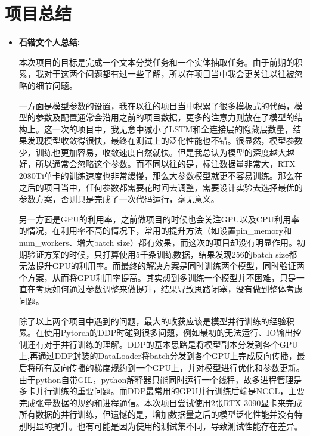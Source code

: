 \documentclass[letterpaper]{article}
\begin{document}
\section{项目总结}
\begin{itemize}
  \item \textbf{石锴文个人总结:} 
  
  本次项目的目标是完成一个文本分类任务和一个实体抽取任务。由于前期的积累，我对于这两个问题都有过一些了解，所以在项目当中我会更关注以往被忽略的细节问题。

  一方面是模型参数的设置，我在以往的项目当中积累了很多模板式的代码，模型的参数及配置通常会沿用之前的项目数据，更多的注意力则放在了模型的结构上。这一次的项目中，我无意中减小了LSTM和全连接层的隐藏层数量，结果发现模型收敛得很快，最终在测试上的泛化性能也不错。很显然，模型参数少，训练也更加容易，收敛速度自然就快。但是我总认为模型的深度越大越好，所以通常会忽略这个参数。而不同以往的是，标注数据量非常大，RTX 2080Ti单卡的训练速度也非常缓慢，那么大参数模型就更不容易训练。那么在之后的项目当中，任何参数都需要花时间去调整，需要设计实验去选择最优的参数方案，否则只是完成了一次代码运行，毫无意义。

  另一方面是GPU的利用率，之前做项目的时候也会关注GPU以及CPU利用率的情况，在利用率不高的情况下，常用的提升方法（如设置pin\_memory和num\_workers、增大batch size）都有效果，而这次的项目却没有明显作用。初期验证方案的时候，只打算使用5千条训练数据，结果发现256的batch size都无法提升GPU的利用率。而最终的解决方案是同时训练两个模型，同时验证两个方案，从而将GPU利用率提高。其实想到多训练一个模型并不困难，只是一直在考虑如何通过参数调整来做提升，结果导致思路闭塞，没有做到整体考虑问题。

  除了以上两个项目中遇到的问题，最大的收获应该是模型并行训练的经验积累。在使用Pytorch的DDP时碰到很多问题，例如最初的无法运行、IO输出控制还有对于并行训练的理解。DDP的基本思路是将模型副本分发到各个GPU上,再通过DDP封装的DataLoader将batch分发到各个GPU上完成反向传播，最后将所有反向传播的梯度规约到一个GPU上，并对模型进行优化和参数更新。由于python自带GIL，python解释器只能同时运行一个线程，故多进程管理是多卡并行训练的重要问题。而DDP最常用的GPU并行训练后端是NCCL，主要完成张量数据的规约和进程通信。本次项目尝试使用2张RTX 3090显卡来完成所有数据的并行训练，但遗憾的是，增加数据量之后的模型泛化性能并没有特别明显的提升。也有可能是因为使用的测试集不同，导致测试性能存在差异。


\end{itemize}
\end{document}
